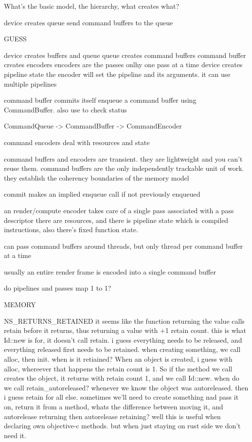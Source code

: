 
What's the basic model, the hierarchy, what creates what?

device creates queue
send command buffers to the queue

GUESS

device creates buffers and queue
queue creates command buffers
command buffer creates encoders
encoders are the passes
onlhy one pass at a time
device creates pipeline state
the encoder will set the pipeline and its arguments. 
it can use multiple pipelines


command buffer commits itself
enqueue a command buffer using CommandBuffer. also use to check status

CommandQueue -> CommandBuffer -> CommandEncoder

command encoders deal with resources and state

command buffers and encoders are transient. they are lightweight and you can't reuse them.
command buffers are the only independently trackable unit of work. they establish the coherency boundaries of the memory model

commit makes an implied enqueue call if not previously enqueued

an render/compute encoder takes care of a single pass
associated with a pass descriptor
there are resources, and there is pipeline state which is compiled instructions, also there's fixed function state.

can pass command buffers around threads, but only thread per command buffer at a time

usually an entire render frame is encoded into a single command buffer

do pipelines and passes map 1 to 1?




MEMORY

NS_RETURNS_RETAINED
it seems like the function returning the value calls retain before it returns, thus returning a value with +1 retain count. this is what Id::new is for, it doesn't call retain. 
i guess everything needs to be released, and everything released first needs to be retained.
when creating something, we call alloc, then init. when is it retiained?
When an object is created, i guess with alloc, whereever that happens the retain count is 1.
So if the method we call creates the object, it returns with retain count 1, and we call Id::new.
when do we call retain_autoreleased? whenever we know the object was autoreleased. then i guess retain for all else. 
sometimes we'll need to create something nad pass it on, return it from a method,
whats the difference between moving it, and autorelease returning then autorelease retaining? well this is useful when declaring own objective-c methods. but when just staying on rust side we don't need it. 

